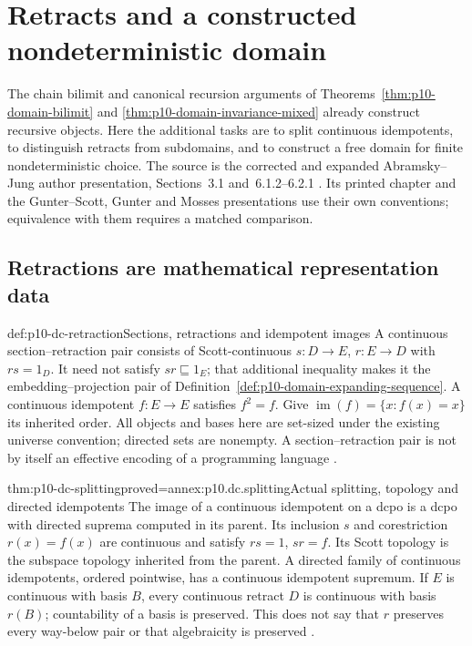 \section{Retracts and a constructed nondeterministic domain}
\label{sec:p10-domain-constructions-retractions}

The chain bilimit and canonical recursion arguments of
Theorems~\ref{thm:p10-domain-bilimit} and
\ref{thm:p10-domain-invariance-mixed} already construct recursive objects.
Here the additional tasks are to split continuous idempotents, to distinguish
retracts from subdomains, and to construct a free domain for finite
nondeterministic choice. The source is the corrected and expanded
Abramsky--Jung author presentation, Sections~3.1 and~6.1.2--6.2.1
\cite[pp.~34--41,87--95]{AbramskyJungCorrectedExpandedDomainTheory}.
Its printed chapter and the Gunter--Scott, Gunter and Mosses presentations
use their own conventions; equivalence with them requires a matched comparison.

\subsection{Retractions are mathematical representation data}

\begin{hbdefinition}{def:p10-dc-retraction}{Sections, retractions and idempotent images}
A continuous section--retraction pair consists of Scott-continuous
\(s:D\to E\), \(r:E\to D\) with \(rs=1_D\).
It need not satisfy \(sr\sqsubseteq1_E\); that additional inequality
makes it the embedding--projection pair of
Definition~\ref{def:p10-domain-expanding-sequence}.
A continuous idempotent \(f:E\to E\) satisfies \(f^2=f\).
Give \(\operatorname{im}(f)=\{x:f(x)=x\}\) its inherited order.
All objects and bases here are set-sized under the existing universe
convention; directed sets are nonempty. A section--retraction pair is
not by itself an effective encoding of a programming language
\cite[Definitions~3.1.1,3.1.15, pp.~34,39]
{AbramskyJungCorrectedExpandedDomainTheory}.
\end{hbdefinition}

\begin{hbtheorem}{thm:p10-dc-splitting}{proved=annex:p10.dc.splitting}{Actual splitting, topology and directed idempotents}
The image of a continuous idempotent on a dcpo is a dcpo with
directed suprema computed in its parent. Its inclusion \(s\) and
corestriction \(r(x)=f(x)\) are continuous and satisfy \(rs=1\),
\(sr=f\). Its Scott topology is the subspace topology inherited from
the parent. A directed family of continuous idempotents, ordered
pointwise, has a continuous idempotent supremum.
If \(E\) is continuous with basis \(B\), every continuous retract
\(D\) is continuous with basis \(r(B)\); countability of a basis is
preserved. This does not say that \(r\) preserves every way-below pair
or that algebraicity is preserved
\cite[Lemma~3.1.3; Theorem~3.1.4; Propositions~3.1.7--8, pp.~34--36]
{AbramskyJungCorrectedExpandedDomainTheory}.
\end{hbtheorem}

